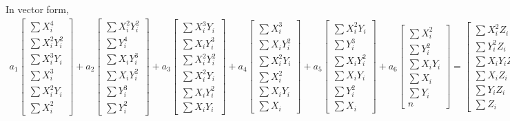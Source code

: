\documentclass{article}
\begin{document}
In vector form,\\
\begin{gather} 
    a_1
    \begin{bmatrix}
        \sum X_i^4\\
        \sum X_i^2Y_i^2\\
        \sum X_i^3Y_i\\
        \sum X_i^3\\
        \sum X_i^2Y_i\\
        \sum X_i^2
    \end{bmatrix}
    +
    a_2 
    \begin{bmatrix}
        \sum X_i^2Y_i^2\\
        \sum Y_i^4\\
        \sum X_iY_i^3\\
        \sum X_iY_i^2\\
        \sum Y_i^3\\
        \sum Y_i^2
    \end{bmatrix}
    +
    a_3
    \begin{bmatrix}
        \sum X_i^3Y_i\\
        \sum X_iY_i^3\\
        \sum X_i^2Y_i^2\\
        \sum X_i^2Y_i\\
        \sum X_iY_i^2\\
        \sum X_iY_i
    \end{bmatrix}
    +
    a_4
    \begin{bmatrix}
    \sum X_i^3\\
    \sum X_iY_i^2\\
    \sum X_i^2Y_i\\
    \sum X_i^2\\
    \sum X_iY_i\\
    \sum X_i
    \end{bmatrix}
    +
    a_5
    \begin{bmatrix}
    \sum X_i^2Y_i\\
    \sum Y_i^3\\
    \sum X_iY_i^2\\
    \sum X_iY_i\\
    \sum Y_i^2\\
    \sum X_i
    \end{bmatrix}
    +
    a_6
    \begin{bmatrix}
    \sum X_i^2\\
    \sum Y_i^2\\
    \sum X_iY_i\\
    \sum X_i\\
    \sum Y_i\\
     n
    \end{bmatrix}
    =
    \begin{bmatrix}
    \sum X_i^2Z_i\\
    \sum Y_i^2Z_i\\
    \sum X_iY_iZ_i\\
    \sum X_iZ_i\\
    \sum Y_iZ_i\\
    \sum Z_i
    \end{bmatrix}
    \end{gather}
\end{document}
